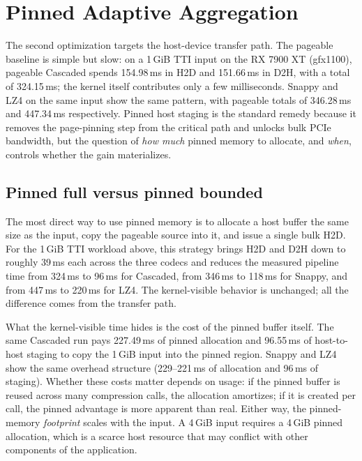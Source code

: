 \section{Pinned Adaptive Aggregation}
\label{sec:optim-adaptive-tiled}

The second \arcto{} optimization targets the host-device transfer
path. The pageable baseline is simple but slow: on a 1\,GiB TTI
input on the RX 7900 XT (gfx1100), pageable Cascaded spends
154.98\,ms in H2D and 151.66\,ms in D2H, with a total of 324.15\,ms;
the kernel itself contributes only a few milliseconds. Snappy and LZ4
on the same input show the same pattern, with pageable totals of
346.28\,ms and 447.34\,ms respectively. Pinned host staging is the
standard remedy because it removes the page-pinning step from the
critical path and unlocks bulk PCIe bandwidth, but the question of
\emph{how much} pinned memory to allocate, and \emph{when}, controls
whether the gain materializes.

\subsection{Pinned full versus pinned bounded}
\label{sec:pinned-tradeoff}

The most direct way to use pinned memory is to allocate a host buffer
the same size as the input, copy the pageable source into it, and
issue a single bulk H2D. For the 1\,GiB TTI workload above, this
strategy brings H2D and D2H down to roughly 39\,ms each across the
three codecs and reduces the measured pipeline time from 324\,ms to
96\,ms for Cascaded, from 346\,ms to 118\,ms for Snappy, and from
447\,ms to 220\,ms for LZ4. The kernel-visible behavior is unchanged;
all the difference comes from the transfer path.

What the kernel-visible time hides is the cost of the pinned buffer
itself. The same Cascaded run pays 227.49\,ms of pinned allocation
and 96.55\,ms of host-to-host staging to copy the 1\,GiB input into
the pinned region. Snappy and LZ4 show the same overhead structure
(229--221\,ms of allocation and 96\,ms of staging). Whether these
costs matter depends on usage: if the pinned buffer is reused across
many compression calls, the allocation amortizes; if it is created
per call, the pinned advantage is more apparent than real. Either
way, the pinned-memory \emph{footprint} scales with the input. A
4\,GiB input requires a 4\,GiB pinned allocation, which is a scarce
host resource that may conflict with other components of the
application.

